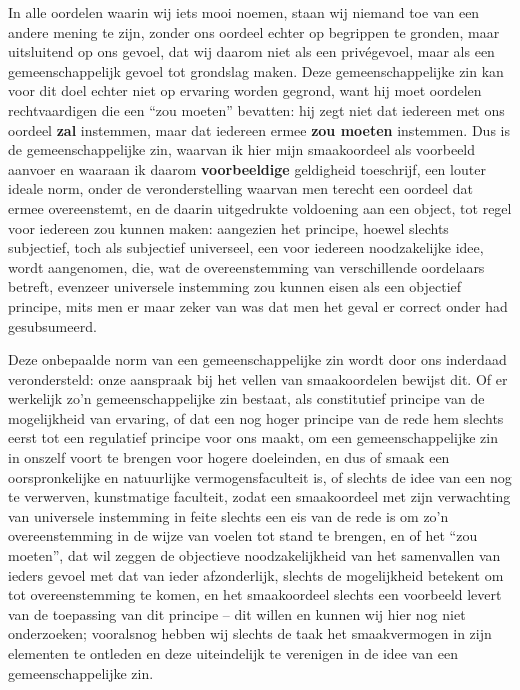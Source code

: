 In alle oordelen waarin wij iets mooi noemen, staan wij niemand toe van een andere mening te zijn, zonder ons oordeel echter op begrippen te gronden, maar uitsluitend op ons gevoel, dat wij daarom niet als een privégevoel, maar als een gemeenschappelijk gevoel tot grondslag maken. Deze gemeenschappelijke zin kan voor dit doel echter niet op ervaring worden gegrond, want hij moet oordelen rechtvaardigen die een “zou moeten” bevatten: hij zegt niet dat iedereen met ons oordeel \textbf{zal} instemmen, maar dat iedereen ermee \textbf{zou moeten} instemmen. Dus is de gemeenschappelijke zin, waarvan ik hier mijn smaakoordeel als voorbeeld aanvoer en waaraan ik daarom \textbf{voorbeeldige} geldigheid toeschrijf, een louter ideale norm, onder de veronderstelling waarvan men terecht een oordeel dat ermee overeenstemt, en de daarin uitgedrukte voldoening aan een object, tot regel voor iedereen zou kunnen maken: aangezien het principe, hoewel slechts subjectief, toch als subjectief universeel, een voor iedereen noodzakelijke idee, wordt aangenomen, die, wat de overeenstemming van verschillende oordelaars betreft, evenzeer universele instemming zou kunnen eisen als een objectief principe, mits men er maar zeker van was dat men het geval er correct onder had gesubsumeerd.

Deze onbepaalde norm van een gemeenschappelijke zin wordt door ons inderdaad verondersteld: onze aanspraak bij het vellen van smaakoordelen bewijst dit. Of er werkelijk zo’n gemeenschappelijke zin bestaat, als constitutief principe van de mogelijkheid van ervaring, of dat een nog hoger principe van de rede hem slechts eerst tot een regulatief principe voor ons maakt, om een gemeenschappelijke zin in onszelf voort te brengen voor hogere doeleinden, en dus of smaak een oorspronkelijke en natuurlijke vermogensfaculteit is, of slechts de idee van een nog te verwerven, kunstmatige faculteit, zodat een smaakoordeel met zijn verwachting van universele instemming in feite slechts een eis van de rede is om zo’n overeenstemming in de wijze van voelen tot stand te brengen, en of het “zou moeten”, dat wil zeggen de objectieve noodzakelijkheid van het samenvallen van ieders gevoel met dat van ieder afzonderlijk, slechts de mogelijkheid betekent om tot overeenstemming te komen, en het smaakoordeel slechts een voorbeeld levert van de toepassing van dit principe – dit willen en kunnen wij hier nog niet onderzoeken; vooralsnog hebben wij slechts de taak het smaakvermogen in zijn elementen te ontleden en deze uiteindelijk te verenigen in de idee van een gemeenschappelijke zin.

